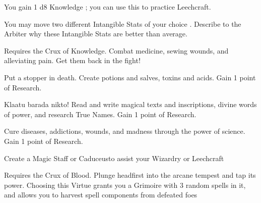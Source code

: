 {  You gain 1 d8 Knowledge \STATIC; you can use this \STATIC to practice Leechcraft.\footnotemark[\value{footnote}]


    You may move two different Intangible Stats of your choice \DCUP.  Describe to the Arbiter why these Intangible Stats are better than average.


  Requires the Crux of Knowledge.  Combat medicine, sewing wounds, and alleviating pain.  Get them back in the fight!
 

  Put a stopper in death.  Create potions and salves, toxins and acids. Gain 1 point of Research.\footnotemark[\value{footnote}]

  
  Klaatu barada nikto! Read and write magical texts and inscriptions, divine words of power, and research True Names. Gain 1 point of Research.\footnotemark[\value{footnote}]


  Cure diseases, addictions, wounds, and madness through the power of science. Gain 1 point of Research.\footnotemark[\value{footnote}]


    Create a Magic Staff or Caduceus\footnotemark[\value{footnote}] to assist your Wizardry or Leechcraft


  Requires the Crux of Blood. Plunge headfirst into the arcane tempest and tap its power.  Choosing this Virtue grants you a Grimoire with 3 random spells in it, and allows you to harvest spell components from defeated foes\footnotemark[\value{footnote}]

  \setcounter{footnote}{0}



}
